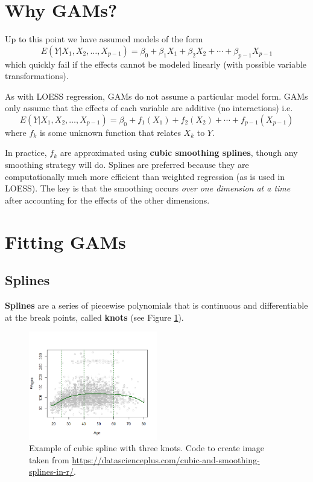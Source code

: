 \documentclass[12pt]{../notes}
\begin{document}

\section{Why GAMs?}

Up to this point we have assumed models of the form 
%
\begin{equation*}
E\left(Y|X_1, X_2, \ldots , X_{p-1}\right) = \beta_0 + \beta_1X_1 + \beta_2X_2 +\cdots + \beta_{p-1}X_{p-1} 
\end{equation*}
%
which quickly fail if the effects cannot be modeled linearly (with possible variable transformations). 

\nspace
As with LOESS regression, GAMs do not assume a particular model form. GAMs only assume that the effects of each variable are additive (no interactions) i.e. 
%
\begin{equation*}
E\left(Y|X_1, X_2, \ldots , X_{p-1}\right) = \beta_0 + f_1(X_1) + f_2(X_2) +\cdots + f_{p-1}(X_{p-1}) 
\end{equation*}
%
where $f_k$ is some unknown function that relates $X_k$ to $Y$.

\nspace
In practice, $f_k$ are approximated using \textbf{cubic smoothing splines}, though any smoothing strategy will do. Splines are preferred because they are computationally much more efficient than weighted regression (as is used in LOESS). The key is that the smoothing occurs \textit{over one dimension at a time} after accounting for the effects of the other dimensions.  

\section{Fitting GAMs}

\subsection{Splines}

\textbf{Splines} are a series of piecewise polynomials that is continuous and differentiable at the break points, called \textbf{knots} (see Figure \ref{fig:spline_example}).

\begin{figure}[H]
\centering
\includegraphics[width = 0.5\textwidth]{../figures/module7/spline_example.png}
\caption{Example of cubic spline with three knots. Code to create image taken from \url{https://datascienceplus.com/cubic-and-smoothing-splines-in-r/}.}
\label{fig:spline_example}
\end{figure}
\end{document}
